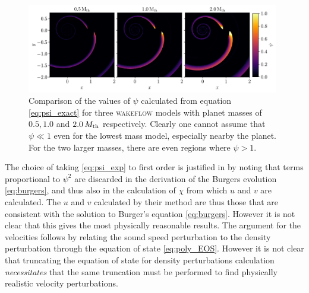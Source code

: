 \begin{figure}
    \centering
    \includegraphics[width = 0.98\textwidth]{figures/psi 2.pdf}
    \caption{Comparison of the values of $\psi$ calculated from equation \ref{eq:psi_exact} for three \textsc{wakeflow} models with planet masses of $0.5, 1.0$ and $2.0 \, M_{\rm{th}}$ respectively. Clearly one cannot assume that $\psi \ll 1$ even for the lowest mass model, especially nearby the planet. For the two larger masses, there are even regions where $\psi > 1$.}
    \label{fig:psi_comparison}
\end{figure}

The choice of taking \ref{eq:psi_exp} to first order is justified in \citet{bollati2021} by noting that terms proportional to $\psi^2$ are discarded in the derivation of the Burgers evolution \ref{eq:burgers}, and thus also in the calculation of $\chi$ from which $u$ and $v$ are calculated.
The $u$ and $v$ calculated by their method are thus those that are consistent with the solution to Burger's equation \ref{eq:burgers}. 
However it is not clear that this gives the most physically reasonable results.
The argument for the velocities follows by relating the sound speed perturbation to the density perturbation through the equation of state \ref{eq:poly_EOS}.
However it is not clear that truncating the equation of state for density perturbations calculation \textit{necessitates} that the same truncation must be performed to find physically realistic velocity perturbations.

